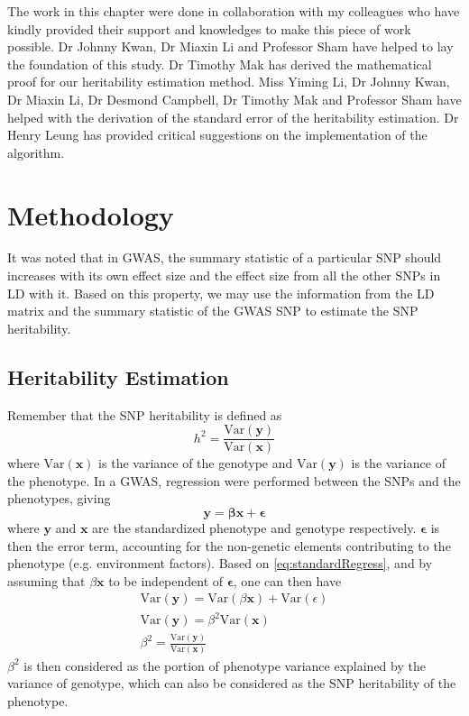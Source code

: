 	The work in this chapter were done in collaboration with my colleagues who have kindly provided their support and knowledges to make this piece of work possible.
	Dr Johnny Kwan, Dr Miaxin Li and Professor Sham have helped to lay the foundation of this study. 
	Dr Timothy Mak has derived the mathematical proof for our heritability estimation method. 
	Miss Yiming Li, Dr Johnny Kwan, Dr Miaxin Li, Dr Desmond Campbell, Dr Timothy Mak and Professor Sham have helped with the derivation of the standard error of the heritability estimation. 
	Dr Henry Leung has provided critical suggestions on the implementation of the algorithm.
	
	\section{Methodology}	
		It was noted that in \gls{GWAS}, the summary statistic of a particular \gls{SNP} should increases with its own effect size and the effect size from all the other \glspl{SNP} in \gls{LD} with it.
		Based on this property, we may use the information from the \gls{LD} matrix and the summary statistic of the \gls{GWAS} \gls{SNP} to estimate the \gls{SNP} heritability.
		
		\subsection{Heritability Estimation}
			Remember that the \gls{SNP} heritability is defined as 
			$$
				h^2 = \frac{\mathrm{Var}(\boldsymbol{y})}{\mathrm{Var}(\boldsymbol{x})}
			$$
			where $\mathrm{Var}(\boldsymbol{x})$ is the variance of the genotype and $\mathrm{Var}(\boldsymbol{y})$ is the variance of the phenotype.
			In a \gls{GWAS}, regression were performed between the \glspl{SNP} and the phenotypes, giving
			\begin{equation}
				\boldsymbol{y}=\boldsymbol{\beta x}+\boldsymbol{\epsilon}
				\label{eq:standardRegress}
			\end{equation}
			where $\boldsymbol{y}$ and $\boldsymbol{x}$ are the standardized phenotype and genotype respectively. 
			$\boldsymbol{\epsilon}$ is then the error term, accounting for the non-genetic elements contributing to the phenotype (e.g. environment factors).
			Based on \cref{eq:standardRegress}, and by assuming that $\beta \boldsymbol{x}$ to be independent of $\boldsymbol{\epsilon}$, one can then have
			\begin{align}
				\mathrm{Var}(\boldsymbol{y}) = \mathrm{Var}(\beta \boldsymbol{x})+ \mathrm{Var}(\epsilon) \nonumber\\
				\mathrm{Var}(\boldsymbol{y}) = \beta^2\mathrm{Var}(\boldsymbol{x}) \nonumber\\
				\beta^2= \frac{\mathrm{Var}(\boldsymbol{y})}{\mathrm{Var}(\boldsymbol{x})}
				\label{eq:betaHeri}
			\end{align}
			$\beta^2$ is then considered as the portion of phenotype variance explained by the variance of genotype, which can also be considered as the \gls{SNP} heritability of the phenotype.
					
